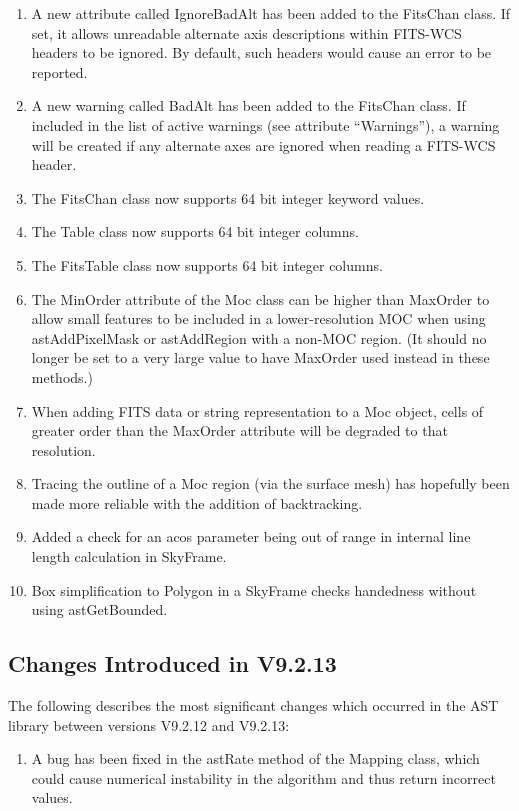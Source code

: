 \documentclass[twoside,11pt]{starlink}
\begin{document}
\begin{enumerate}

\item  A new attribute called IgnoreBadAlt has been added to the FitsChan
class. If set, it allows unreadable alternate axis descriptions within FITS-WCS
headers to be ignored. By default, such headers would cause an error to
be reported.
\item A new warning called BadAlt has been added to the FitsChan class. If
included in the list of active warnings (see attribute ``Warnings''), a
warning will be created if any alternate axes are ignored when reading a
FITS-WCS header.
\item The FitsChan class now supports 64 bit integer keyword values.
\item The Table class now supports 64 bit integer columns.
\item The FitsTable class now supports 64 bit integer columns.
\item The MinOrder attribute of the Moc class can be higher than MaxOrder
to allow small features to be included in a lower-resolution MOC
when using astAddPixelMask or astAddRegion with a non-MOC region.
(It should no longer be set to a very large value to have MaxOrder
used instead in these methods.)
\item When adding FITS data or string representation to a Moc object,
cells of greater order than the MaxOrder attribute will be degraded
to that resolution.
\item Tracing the outline of a Moc region (via the surface mesh) has
hopefully been made more reliable with the addition of backtracking.
\item Added a check for an acos parameter being out of range in internal
line length calculation in SkyFrame.
\item Box simplification to Polygon in a SkyFrame checks handedness
without using astGetBounded.


\end{enumerate}


\subsection{Changes Introduced in V9.2.13}
The following describes the most significant changes which
occurred in the AST library between versions V9.2.12 and V9.2.13:

\begin{enumerate}

\item   A bug has been fixed in the astRate method of the Mapping class,
which could cause numerical instability in the algorithm and thus return
incorrect values.

\end{enumerate}
\end{document}
